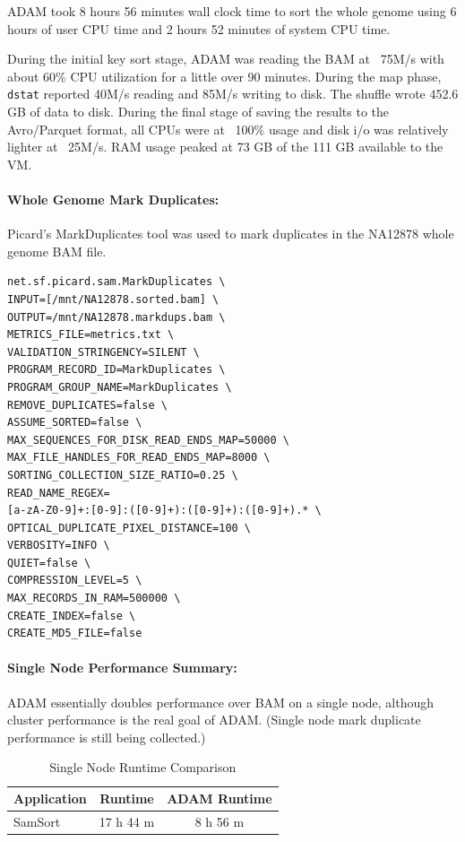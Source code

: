 \documentclass[10pt,twocolumn]{article}
\theoremstyle{plain}
\begin{document}
ADAM took 8 hours 56 minutes wall clock time to sort the whole genome using 6 hours of user CPU time and 2 hours 52 minutes of 
system CPU time. 

During the initial key sort stage, ADAM was reading the BAM at ~75M/s with about 60\% CPU utilization for a little over
90 minutes. During the map phase, \texttt{dstat} reported 40M/s reading and 85M/s writing to disk. The shuffle wrote
452.6 GB of data to disk. During the final stage of saving the results to the Avro/Parquet format, all CPUs were at
~100\% usage and disk i/o was relatively lighter at ~25M/s. RAM usage peaked at 73 GB of the 111 GB available to the VM.

\paragraph{Whole Genome Mark Duplicates:}
\label{sec:single-node-whole-genome}

Picard's MarkDuplicates tool was used to mark duplicates in the NA12878 whole genome BAM file.

\begin{lstlisting}
net.sf.picard.sam.MarkDuplicates \
INPUT=[/mnt/NA12878.sorted.bam] \
OUTPUT=/mnt/NA12878.markdups.bam \
METRICS_FILE=metrics.txt \
VALIDATION_STRINGENCY=SILENT \
PROGRAM_RECORD_ID=MarkDuplicates \
PROGRAM_GROUP_NAME=MarkDuplicates \
REMOVE_DUPLICATES=false \
ASSUME_SORTED=false \
MAX_SEQUENCES_FOR_DISK_READ_ENDS_MAP=50000 \
MAX_FILE_HANDLES_FOR_READ_ENDS_MAP=8000 \
SORTING_COLLECTION_SIZE_RATIO=0.25 \
READ_NAME_REGEX=
[a-zA-Z0-9]+:[0-9]:([0-9]+):([0-9]+):([0-9]+).* \
OPTICAL_DUPLICATE_PIXEL_DISTANCE=100 \
VERBOSITY=INFO \
QUIET=false \
COMPRESSION_LEVEL=5 \
MAX_RECORDS_IN_RAM=500000 \
CREATE_INDEX=false \
CREATE_MD5_FILE=false
\end{lstlisting}

\paragraph{Single Node Performance Summary:}
\label{sec:single-node-summary}
ADAM essentially doubles performance over BAM on a single node, although cluster performance is the real goal of ADAM. (Single node mark duplicate performance is still being collected.)

\begin{table}[h]
\caption{Single Node Runtime Comparison}
\label{tab:single-node-performance}
\begin{center}
\begin{tabular}{| l | c | c |}
\hline
\bf Application & \bf Runtime & \bf ADAM Runtime \\
\hline
SamSort & 17 h 44 m & 8 h 56 m \\
\hline
\end{tabular}
\end{center}
\end{table}
\end{document}

